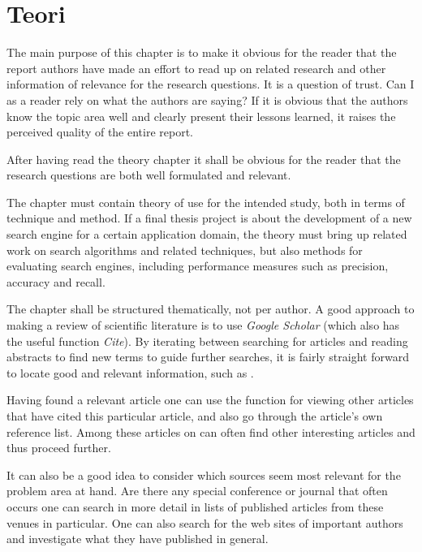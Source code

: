 \chapter{Teori}
\label{cha:theory}



The main purpose of this chapter is to make it obvious for
the reader that the report authors have made an effort to read
up on related research and other information of relevance for
the research questions. It is a question of trust. Can I as a
reader rely on what the authors are saying? If it is obvious
that the authors know the topic area well and clearly present
their lessons learned, it raises the perceived quality of the
entire report.

After having read the theory chapter it shall be obvious for
the reader that the research questions are both well
formulated and relevant.

The chapter must contain theory of use for the intended
study, both in terms of technique and method. If a final thesis
project is about the development of a new search engine for
a certain application domain, the theory must bring up related
work on search algorithms and related techniques, but also
methods for evaluating search engines, including
performance measures such as precision, accuracy and
recall.

The chapter shall be structured thematically, not per author.
A good approach to making a review of scientific literature
is to use \emph{Google Scholar} (which also has the useful function
\emph{Cite}). By iterating between searching for articles and reading
abstracts to find new terms to guide further searches, it is
fairly straight forward to locate good and relevant
information, such as \cite{test}.

Having found a relevant article one can use the function for
viewing other articles that have cited this particular article,
and also go through the article’s own reference list. Among
these articles on can often find other interesting articles and
thus proceed further.

It can also be a good idea to consider which sources seem
most relevant for the problem area at hand. Are there any
special conference or journal that often occurs one can search
in more detail in lists of published articles from these venues
in particular. One can also search for the web sites of
important authors and investigate what they have published
in general. 

